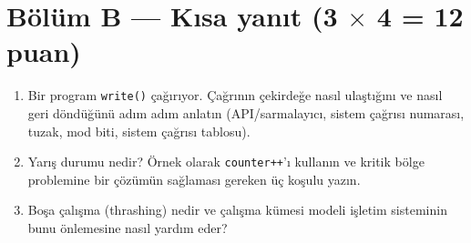 \section*{Bölüm B --- Kısa yanıt \hfill (3 $\times$ 4 = 12 puan)}
\begin{enumerate}[leftmargin=1.8em,label=B\arabic*.]
  \item Bir program \texttt{write()} çağırıyor. Çağrının çekirdeğe nasıl ulaştığını ve nasıl geri döndüğünü adım adım anlatın (API/sarmalayıcı, sistem çağrısı numarası, tuzak, mod biti, sistem çağrısı tablosu). 
  \ans{3.2cm}
  \item Yarış durumu nedir? Örnek olarak \texttt{counter++}'ı kullanın ve kritik bölge problemine bir çözümün sağlaması gereken üç koşulu yazın. 
  \ans{3.2cm}
  \item Boşa çalışma (thrashing) nedir ve çalışma kümesi modeli işletim sisteminin bunu önlemesine nasıl yardım eder? 
  \ans{3.2cm}
\end{enumerate}

\newpage
